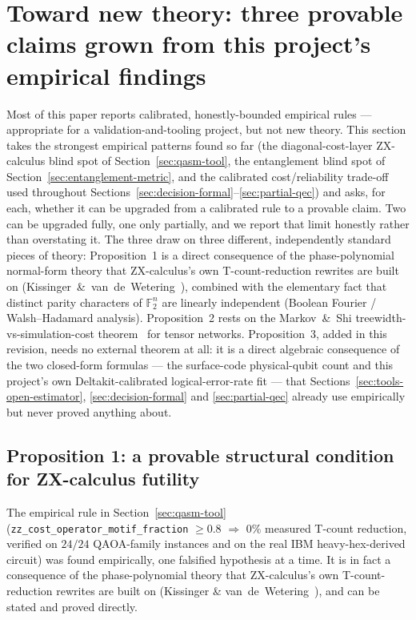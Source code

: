 \documentclass[9pt,twocolumn]{extarticle}
\begin{document}
\section{Toward new theory: three provable claims grown from this project's empirical findings}
\label{sec:new-theory}
Most of this paper reports calibrated, honestly-bounded empirical rules ---
appropriate for a validation-and-tooling project, but not new theory. This
section takes the strongest empirical patterns found so far (the
diagonal-cost-layer ZX-calculus blind spot of Section~\ref{sec:qasm-tool},
the entanglement blind spot of Section~\ref{sec:entanglement-metric}, and
the calibrated cost/reliability trade-off used throughout
Sections~\ref{sec:decision-formal}--\ref{sec:partial-qec}) and asks, for
each, whether it can be upgraded from a calibrated rule to a provable
claim. Two can be upgraded fully, one only partially, and we report that
limit honestly rather than overstating it. The three draw on three
different, independently standard pieces of theory: Proposition~1 is a
direct consequence of the phase-polynomial normal-form theory that
ZX-calculus's own T-count-reduction rewrites are built on
(Kissinger~\&~van~de~Wetering~\cite{kissinger2019}), combined with the
elementary fact that distinct parity characters of $\mathbb{F}_2^n$ are
linearly independent (Boolean Fourier / Walsh--Hadamard analysis).
Proposition~2 rests on the Markov~\&~Shi treewidth-vs-simulation-cost
theorem~\cite{markovshi2008} for tensor networks. Proposition~3, added in
this revision, needs no external theorem at all: it is a direct algebraic
consequence of the two closed-form formulas --- the surface-code
physical-qubit count and this project's own Deltakit-calibrated
logical-error-rate fit --- that Sections~\ref{sec:tools-open-estimator},
\ref{sec:decision-formal} and \ref{sec:partial-qec} already use
empirically but never proved anything about.

\subsection{Proposition 1: a provable structural condition for ZX-calculus futility}
\label{sec:prop1}
The empirical rule in Section~\ref{sec:qasm-tool}
(\texttt{zz\_cost\_operator\_motif\_fraction} $\geq 0.8$ $\Rightarrow$ $0\%$
measured T-count reduction, verified on $24/24$ QAOA-family instances and
on the real IBM heavy-hex-derived circuit) was found empirically, one
falsified hypothesis at a time. It is in fact a consequence of the
phase-polynomial theory that ZX-calculus's own T-count-reduction rewrites
are built on (Kissinger \& van~de~Wetering~\cite{kissinger2019}), and can
be stated and proved directly.
\end{document}
